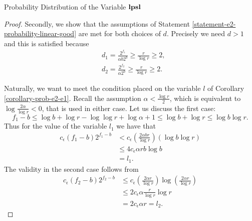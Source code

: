 \begin{section}{Probability Distribution of the Variable \texorpdfstring{$\mathbf{lpsl}$}{lpsl}}
\begin{proof}
Secondly, we show that the assumptions of Statement \ref{statement-e2-probability-linear-good} are met for both choices of $d$. Precisely we need $d > 1$ and this is satisfied because
\[
\begin{split}
& d_1 = \frac{2 ^ {f_1}}{\alpha b 2 ^ b} \geq \frac{r}{\log r} \geq 2 \text{,} \\
& d_2 = \frac{2 ^ {f_2}}{\alpha 2 ^ b} \geq \frac{r}{\log r} \geq 2 \text{.}
\end{split}
\]

Naturally, we want to meet the condition placed on the variable $l$ of Corollary \ref{corollary-prob-e2-e1}. Recall the assumption $\alpha < \frac{\log r}{2}$, which is equivalent to $\log \frac{2\alpha}{\log r} < 0$, that is used in either case. Let us discuss the first case:
\[ 
	f_1 - b \leq \log b + \log r - \log \log r + \log \alpha + 1 \leq \log b + \log r \leq \log b \log r \text{.} 
\] Thus for the value of the variable $l_1$ we have that 
\[
\begin{split}
c_{\epsilon} (f_1 - b) 2 ^ {f_1 - b}
	& < c_{\epsilon} \left(\frac{2 \alpha b r}{\log r} \right) \left(\log b \log r \right) \\
	& \leq 4 c_{\epsilon} \alpha r b \log b \\
	& = l_1 \text{.}
\end{split}
\]
The validity in the second case follows from
\[
\begin{split}
c_\epsilon (f_2 - b) 2 ^ {f_2 - b}
	& \leq c_\epsilon \left(\frac{2 \alpha r}{\log r}\right) \log \left( \frac{2 \alpha r}{\log r} \right) \\
	& \leq 2 c_\epsilon \alpha \frac{r}{\log r} \log r \\
	& = 2 c_\epsilon \alpha r = l_2 \text{.}
\end{split}
\]



\end{proof}
\end{section}
